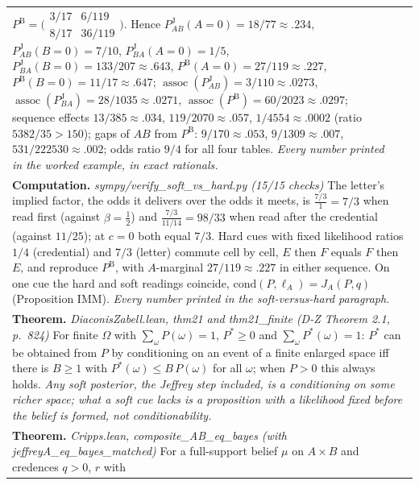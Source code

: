 \documentclass[10pt]{article}
\theoremstyle{definition}
\newcommand{\PB}{P^{\mathrm{B}}}
\newcommand{\PJ}{P^{\mathrm{J}}}
\newcommand{\assoc}{\operatorname{assoc}}
\newlength{\fullw}\setlength{\fullw}{25.9cm}
\begin{document}
{\begin{longtable}{|p{0.9cm}|p{12.2cm}|p{12.2cm}|}
{$\PB=\bigl(\begin{smallmatrix}3/17&6/119\\8/17&36/119\end{smallmatrix}\bigr)$. Hence
$\PJ_{AB}(A{=}0)=18/77\approx.234$, $\PJ_{AB}(B{=}0)=7/10$, $\PJ_{BA}(A{=}0)=1/5$,
$\PJ_{BA}(B{=}0)=133/207\approx.643$, $\PB(A{=}0)=27/119\approx.227$,
$\PB(B{=}0)=11/17\approx.647$; $\assoc(\PJ_{AB})=3/110\approx.0273$,
$\assoc(\PJ_{BA})=28/1035\approx.0271$, $\assoc(\PB)=60/2023\approx.0297$; sequence
effects $13/385\approx.034$, $119/2070\approx.057$, $1/4554\approx.0002$ (ratio
$5382/35>150$); gaps of $AB$ from $\PB$: $9/170\approx.053$, $9/1309\approx.007$,
$531/222530\approx.002$; odds ratio $9/4$ for all four tables. \newline \textit{Every number printed in the worked example, in exact rationals.}} \\
\multicolumn{3}{|p{\fullw}|}{\textbf{Computation.} \textit{sympy/verify\_soft\_vs\_hard.py (15/15 checks)} \newline The letter's implied factor, the odds it delivers over the odds it meets, is
$\frac{7/3}{1}=7/3$ when read first (against $\beta=\tfrac12$) and
$\frac{7/3}{11/14}=98/33$ when read after the credential (against $11/25$); at $c=0$
both equal $7/3$. Hard cues with fixed likelihood ratios $1/4$ (credential) and $7/3$
(letter) commute cell by cell, $E$ then $F$ equals $F$ then $E$, and reproduce $\PB$,
with $A$-marginal $27/119\approx.227$ in either sequence. On one cue the hard and soft
readings coincide, $\mathrm{cond}(P,\ell_A)=J_A(P,q)$ (Proposition IMM). \newline \textit{Every number printed in the soft-versus-hard paragraph.}} \\
\multicolumn{3}{|p{\fullw}|}{\textbf{Theorem.} \textit{DiaconisZabell.lean, thm21 and thm21\_finite (D-Z Theorem 2.1, p.~824)} \newline For finite $\Omega$ with $\sum_\omega P(\omega)=1$, $P^*\ge0$ and
$\sum_\omega P^*(\omega)=1$: $P^*$ can be obtained from $P$ by conditioning on an event
of a finite enlarged space iff there is $B\ge1$ with $P^*(\omega)\le B\,P(\omega)$ for
all $\omega$; when $P>0$ this always holds. \newline \textit{Any soft posterior, the Jeffrey step included, is a conditioning on some richer
space; what a soft cue lacks is a proposition with a likelihood fixed before the belief
is formed, not conditionability.}} \\
\multicolumn{3}{|p{\fullw}|}{\textbf{Theorem.} \textit{Cripps.lean, composite\_AB\_eq\_bayes (with jeffreyA\_eq\_bayes\_matched)} \newline For a full-support belief $\mu$ on $A\times B$ and credences $q>0$, $r$ with
}
\end{longtable}}
\end{document}

